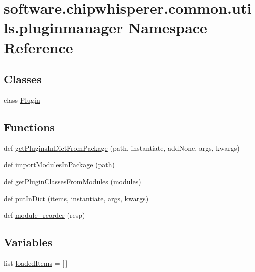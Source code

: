\hypertarget{namespacesoftware_1_1chipwhisperer_1_1common_1_1utils_1_1pluginmanager}{}\section{software.\+chipwhisperer.\+common.\+utils.\+pluginmanager Namespace Reference}
\label{namespacesoftware_1_1chipwhisperer_1_1common_1_1utils_1_1pluginmanager}
\subsection*{Classes}
\begin{DoxyCompactItemize}
\item 
class \hyperlink{classsoftware_1_1chipwhisperer_1_1common_1_1utils_1_1pluginmanager_1_1Plugin}{Plugin}
\end{DoxyCompactItemize}
\subsection*{Functions}
\begin{DoxyCompactItemize}
\item 
def \hyperlink{namespacesoftware_1_1chipwhisperer_1_1common_1_1utils_1_1pluginmanager_ab548f765a1943ab1d23c0126a1c43e5b}{get\+Plugins\+In\+Dict\+From\+Package} (path, instantiate, add\+None, args, kwargs)
\item 
def \hyperlink{namespacesoftware_1_1chipwhisperer_1_1common_1_1utils_1_1pluginmanager_ab676ad867096bb4c10184958fdb64699}{import\+Modules\+In\+Package} (path)
\item 
def \hyperlink{namespacesoftware_1_1chipwhisperer_1_1common_1_1utils_1_1pluginmanager_a64b8a11fb7e35e9c3c566f71a40c1581}{get\+Plugin\+Classes\+From\+Modules} (modules)
\item 
def \hyperlink{namespacesoftware_1_1chipwhisperer_1_1common_1_1utils_1_1pluginmanager_aef75a345b6737524966068654fab2415}{put\+In\+Dict} (items, instantiate, args, kwargs)
\item 
def \hyperlink{namespacesoftware_1_1chipwhisperer_1_1common_1_1utils_1_1pluginmanager_add0e94e268386b288202476fe5f34d64}{module\+\_\+reorder} (resp)
\end{DoxyCompactItemize}
\subsection*{Variables}
\begin{DoxyCompactItemize}
\item 
list \hyperlink{namespacesoftware_1_1chipwhisperer_1_1common_1_1utils_1_1pluginmanager_ad3fbdbdc78196085b0709f08be567525}{loaded\+Items} = \mbox{[}$\,$\mbox{]}
\end{DoxyCompactItemize}


